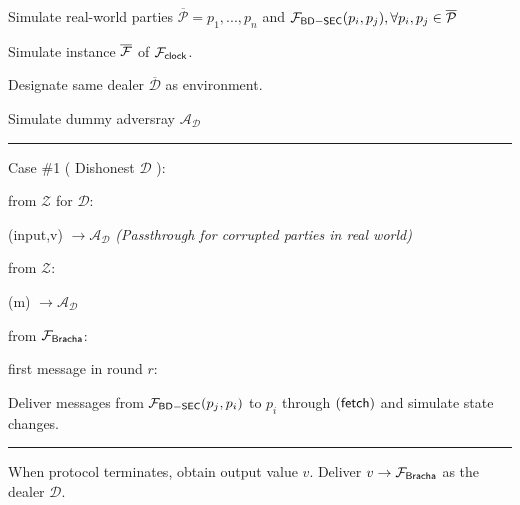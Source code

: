 \begin{bbox}[title={Simulator $S_{\msf{Bracha}}$}]

Simulate real-world parties $\overline{\mathcal{P}} = p_1,...,p_n$ and $\mathcal{F}_{{\mathsf {BD-SEC}}}(p_i,p_j), \forall p_i,p_j \in \overline{\mathcal{P}}$

Simulate instance $\overline{\mathcal{F}}$ of $\mathcal{F}_{{\mathsf {clock}}}$.

Designate same dealer $\overline{\mathcal{D}}$ as environment.

Simulate dummy adversray $\mathcal{A}_{\mathcal{D}}$

\vspace{2mm} \hrule \vspace{2mm}

Case \#1 ( Dishonest $\mathcal{D}$ ):

\OnInput {} from $\mathcal{Z}$ for $\mathcal{D}$:

	\quad \Send (input,v) $\rightarrow \mathcal{A}_{\mathcal{D}}$ {\em (Passthrough for corrupted parties in real world)}

\OnInput {} from $\mathcal{Z}$:

	\quad \Send (m) $\rightarrow \mathcal{A}_{\mathcal{D}}$

\OnInput {} from $\mathcal{F}_{{\mathsf {Bracha}}}$:

	\quad \If first message in round $r$:

		\quad \quad Deliver messages from $\mathcal{F}_{{\mathsf {BD-SEC}}}(p_j,p_i)$ to $p_i$ through $({\mathsf {fetch}})$ and simulate state changes.

\vspace{2mm} \hrule \vspace{2mm}

When protocol terminates, obtain output value $v$. Deliver $v \rightarrow \mathcal{F}_{{\mathsf {Bracha}}}$ as the dealer $\mathcal{D}$.

\end{bbox}
%
%
%
%
%
%
%
%
%
%
%
%
%
%	
%
